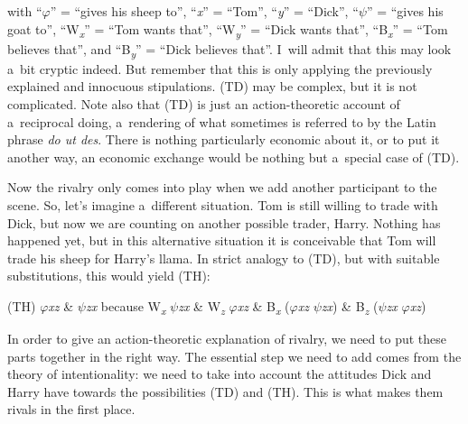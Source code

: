 with ``\textit{$\varphi $}'' = ``gives his sheep to'', ``\textit{x}'' = ``Tom'', ``\textit{y}'' = ``Dick'', ``\textit{$\psi $}'' = ``gives his goat to'', ``W\textit{\textsubscript{x}}'' = ``Tom wants that'', ``W\textit{\textsubscript{y}}'' = ``Dick wants that'', ``B\textit{\textsubscript{x}}'' = ``Tom believes that'', and ``B\textit{\textsubscript{y}}'' = ``Dick believes that''. I~will admit that this may look a~bit cryptic indeed. But remember that this is only applying the previously explained and innocuous stipulations. (TD) may be complex, but it is not complicated. Note also that (TD) is just an action-theoretic account of a~reciprocal doing, a~rendering of what sometimes is referred to by the Latin phrase \textit{do ut des}. There is nothing particularly economic about it, or to put it another way, an economic exchange would be nothing but a~special case of (TD).



Now the rivalry only comes into play when we add another participant to the scene. So, let's imagine a~different situation. Tom is still willing to trade with Dick, but now we are counting on another possible trader, Harry. Nothing has happened yet, but in this alternative situation it is conceivable that Tom will trade his sheep for Harry's llama. In strict analogy to (TD), but with suitable substitutions, this would yield (TH):



(TH) \textit{$\varphi $xz} \& \textit{$\psi $zx} because W\textit{\textsubscript{x}} \textit{$\psi $zx} \& W\textit{\textsubscript{z}} \textit{$\varphi $xz} \& B\textit{\textsubscript{x}} (\textit{$\varphi $xz}  \textit{$\psi $zx}) \& B\textit{\textsubscript{z}} (\textit{$\psi $zx}  \textit{$\varphi $xz})



In order to give an action-theoretic explanation of rivalry, we need to put these parts together in the right way. The essential step we need to add comes from the theory of intentionality: we need to take into account the attitudes Dick and Harry have towards the possibilities (TD) and (TH). This is what makes them rivals in the first place.



